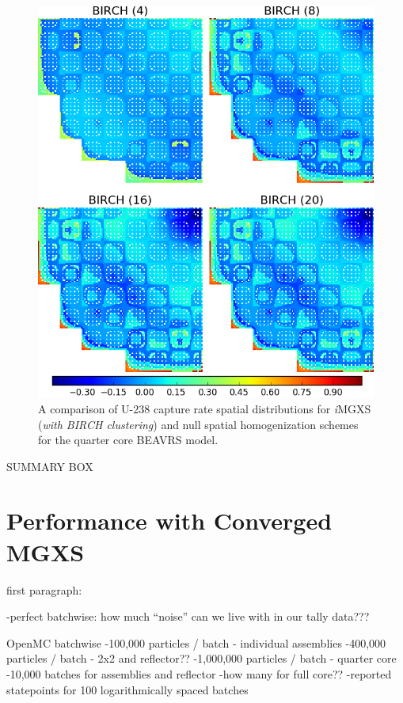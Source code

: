 \begin{figure}[h!]
\centering
\includegraphics[width=0.9\linewidth]{figures/results/compare/full-core/compare-capt-birch}
\vspace{2mm}
\caption[U-238 capture rate comparison for the quarter core BEAVRS model]{A comparison of U-238 capture rate spatial distributions for \textit{i}\ac{MGXS} (\textit{with BIRCH clustering}) and null spatial homogenization schemes for the quarter core BEAVRS model.}
\label{fig:chap11-assm-full-core-capt-rates-birch-comp}
\end{figure}

\clearpage

SUMMARY BOX


\section{Performance with Converged MGXS}
\label{sec:chap11-converge}

first paragraph:

-perfect batchwise: how much ``noise'' can we live with in our tally data???

OpenMC batchwise
-100,000 particles / batch - individual assemblies
-400,000 particles / batch - 2x2 and reflector??
-1,000,000 particles / batch - quarter core
-10,000 batches for assemblies and reflector
-how many for full core??
-reported statepoints for 100 logarithmically spaced batches


